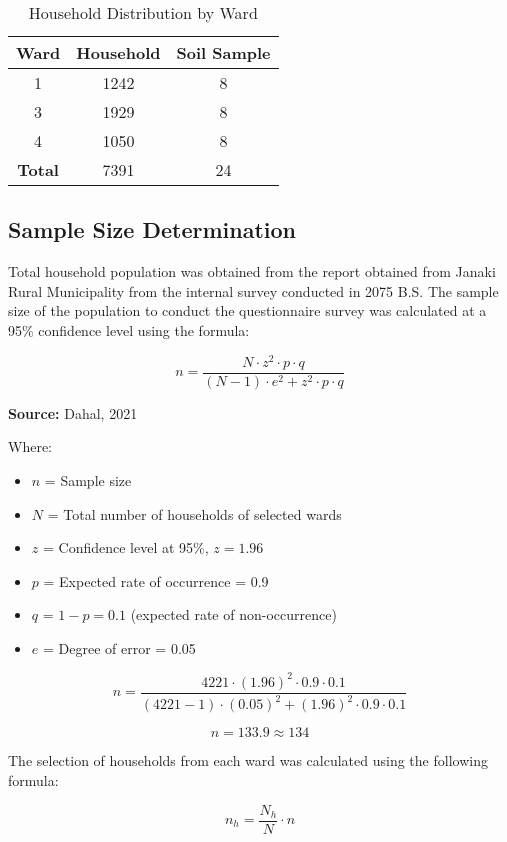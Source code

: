 \begin{table}[h]
\centering
\caption{Household Distribution by Ward}
\label{tab:household_distribution}

\begin{tabular}{|c|c|c|}
\hline
\textbf{Ward} & \textbf{Household} & \textbf{Soil Sample} \\ \hline
1 & 1242 & 8 \\ \hline
3 & 1929 & 8 \\ \hline
4 & 1050 & 8 \\ \hline
\textbf{Total} & 7391 & 24 \\ \hline
\end{tabular}
\end{table}



\subsection{Sample Size Determination}
Total household population was obtained from the report obtained from Janaki Rural Municipality from the internal survey conducted in 2075 B.S. The sample size of the population to conduct the questionnaire survey was calculated at a 95\% confidence level using the formula:

\[
n = \frac{N \cdot z^2 \cdot p \cdot q}{(N - 1) \cdot e^2 + z^2 \cdot p \cdot q}
\]

\textbf{Source:} Dahal, 2021

Where:
\begin{itemize}
    \item $n$ = Sample size
    \item $N$ = Total number of households of selected wards
    \item $z$ = Confidence level at 95\%, $z = 1.96$
    \item $p$ = Expected rate of occurrence = 0.9
    \item $q$ = $1 - p = 0.1$ (expected rate of non-occurrence)
    \item $e$ = Degree of error = 0.05
\end{itemize}

\[
n = \frac{4221 \cdot (1.96)^2 \cdot 0.9 \cdot 0.1}{(4221 - 1) \cdot (0.05)^2 + (1.96)^2 \cdot 0.9 \cdot 0.1}
\]

\[
n = 133.9 \approx 134
\]

The selection of households from each ward was calculated using the following formula:

\[
n_h = \frac{N_h}{N} \cdot n
\]

